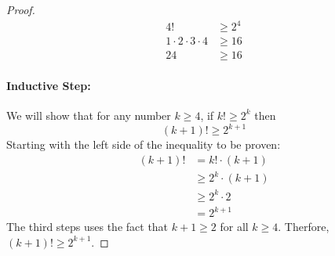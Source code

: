 \documentclass[11pt, letterpaper, twocolumn, fleqn]{article}
\begin{document}
\begin{enumerate}
\begin{proof}
              \begin{align*}
                4! &\geq 2^4 \\
                1\cdot2\cdot3\cdot4 &\geq 16 \\
                24 &\geq 16
              \end{align*}
              \item \paragraph{Inductive Step:} We will show that for any number $k\geq4$, if $k! \geq 2^k$ then 
                $$(k+1)! \geq 2^{k+1}$$
              Starting with the left side of the inequality to be proven:
              \begin{align*}
                (k+1)! &= k! \cdot (k+1) \\
                &\geq 2^k \cdot (k+1) \tag{inductive hypothesis}\\
                &\geq 2^k \cdot 2 \\
                &= 2^{k+1}
              \end{align*}
              The third steps uses the fact that $k+1 \geq 2$ for all $k \geq 4$. Therfore, $(k+1)! \geq 2^{k+1}$.
            \end{proof}

        \end{enumerate}
    
\end{document}
